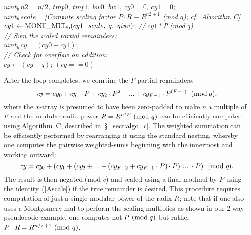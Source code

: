 \documentclass{article}
\begin{document}
\begin{algorithm}
\SetAlgoLined
\vspace{0.1in}
{
	$uint_b\ n2 = n/2,\ tmp0,\ tmp1,\ bw0,\ bw1,\ cy0 = 0,\ cy1 = 0$;\\
	$uint_b\ scale = ${\em [Compute scaling factor $P\cdot R \equiv R^{n2+1}$ (mod $q$); cf.~Algorithm C] }\\
	$cy1 \leftarrow {\rm MONT\_MUL_b}(cy1,\ scale,\ q,\ qinv)$;	{\em// $cy1 * P$ (mod $q$)}\\
	{\em // Sum the scaled partial remainders:}\\
	$uint_b\ cy = (cy0 + cy1)$;\\
	{\em // Check for overflow on addition:}\\
	 {
		$cy \leftarrow (cy - q)$;
	}
	\Return $(cy == 0)$\;
}
\caption{2-way loop-folded implementation of algorithm IS\_DIV\_A.}
\label{algo_ax2}
\end{algorithm}

\noindent After the loop completes, we combine the $F$ partial remainders:
\begin{equation}
cy = cy_0 + cy_1\cdot P + cy_2\cdot P^2 + ... + cy_{F-1}\cdot P^{(F-1)}\ \ ({\rm mod}\ q),
\label{algo_a_part}
\end{equation}
where the $x$-array is presumed to have been zero-padded to make $n$ a multiple of $F$ and the modular radix power $P = R^{n/F}\ ({\rm mod}\ q)$ can be efficiently computed using Algorithm~C, described in~\S~\ref{sect:algo_c}. The weighted summation can be efficiently performed by rearranging it using the standard nesting, whereby one computes the pairwise weighted-sums beginning with the innermost and working outward:
\begin{equation}
cy = cy_0 + (cy_1 + (cy_2 + ... + (cy_{F-2} + cy_{F-1}\cdot P)\cdot P)\ ...\ \cdot P)\ \ ({\rm mod}\ q).
\label{algo_a_nest}
\end{equation}
The result is then negated (mod $q$) and scaled using a final modmul by $P$ using the identity~(\ref{Ascale}) if the true remainder is desired. This procedure requires computation of just a single modular power of the radix $R$; note that if one also uses a Montgomery-mul to perform the scaling multiplies as shown in our 2-way pseudocode example, one computes not $P\ ({\rm mod}\ q)$ but rather $P\cdot R = R^{n/F+1}\ ({\rm mod}\ q)$.
\end{document}
